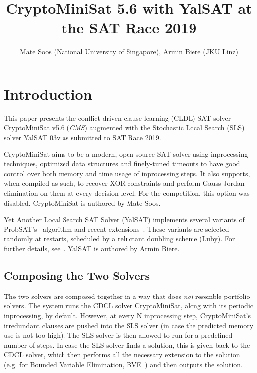 \documentclass[final]{ieee}
\begin{document}
\title{CryptoMiniSat 5.6 with YalSAT at the SAT Race 2019}
\author{Mate Soos (National University of Singapore), Armin Biere (JKU Linz)}

\maketitle
\thispagestyle{empty}
\pagestyle{empty}

\section{Introduction}
This paper presents the conflict-driven clause-learning (CLDL) SAT solver CryptoMiniSat v5.6 (\emph{CMS}) augmented with the Stochastic Local Search (SLS)~\cite{Selman95localsearch} solver YalSAT 03v as submitted to SAT Race 2019.

CryptoMiniSat aims to be a modern, open source SAT solver using inprocessing techniques, optimized data structures and finely-tuned timeouts to have good control over both memory and time usage of inprocessing steps. It also supports, when compiled as such, to recover XOR constraints and perform Gauss-Jordan elimination on them at every decision level. For the competition, this option was disabled. CryptoMiniSat is authored by Mate Soos.

Yet Another Local Search SAT Solver (YalSAT) implements several variants of ProbSAT's~\cite{probsat} algorithm and recent extensions~\cite{balint-improving-sls}. These variants are selected randomly at restarts, scheduled by a reluctant doubling scheme (Luby). For further details, see~\cite{sat-comp-2014-armin}. YalSAT is authored by Armin Biere.

\subsection{Composing the Two Solvers}
The two solvers are composed together in a way that does \emph{not} resemble portfolio solvers. The system runs the CDCL solver CryptoMiniSat, along with its periodic inprocessing, by default. However, at every N inprocessing step, CryptoMiniSat's irredundant clauses are pushed into the SLS solver (in case the predicted memory use is not too high). The SLS solver is then allowed to run for a predefined number of steps. In case the SLS solver finds a solution, this is given back to the CDCL solver, which then performs all the necessary extension to the solution (e.g. for Bounded Variable Elimination, BVE~\cite{BVE}) and then outputs the solution.
\end{document}
